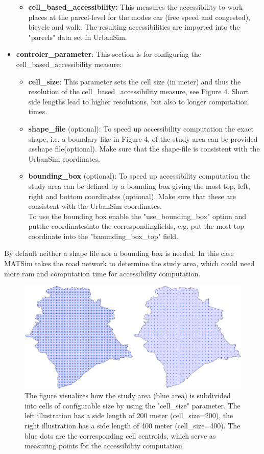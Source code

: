 \begin{itemize}
\begin{itemize}
	\item \textbf{cell\_based\_accessibility: }This measures the  accessibility to work places at the parcel-level for the modes car (free  speed and congested), bicycle and walk. The resulting accessibilities  are imported into the "parcels" data set in UrbanSim.
\end{itemize}
	\item \textbf{controler\_parameter}: This section is for configuring the cell\_based\_accessibility measure:   
\begin{itemize}
	\item \textbf{cell\_size}: This parameter sets the cell size  (in meter) and thus the resolution of the cell\_based\_accessibility  measure, see Figure 4. Short side lengths lead to higher resolutions,  but also to longer computation times.
	\item \textbf{shape\_file} (optional): To speed up accessibility  computation the exact shape, i.e. a boundary like in Figure 4, of the  study area can be provided asshape file(optional). Make sure that the shape-file is consistent with the UrbanSim coordinates.
	\item \textbf{bounding\_box }(optional): To speed up  accessibility computation the study area can be defined by a bounding  box giving the most top, left, right and bottom coordinates (optional).  Make sure that these are consistent with the UrbanSim coordinates.
\\     To use the bounding box enable the "use\_bounding\_box" option and putthe coordinatesinto the correspondingfields, e.g. put the most top coordinate into the "baounding\_box\_top" field.
\end{itemize}
\end{itemize}

By  default neither a shape file nor a bounding box is needed. In this case  MATSim takes the road network to determine the study area, which could  need more ram and computation time for accessibility computation.

\begin{figure}[htp]
\includegraphics[width=\textwidth]{figures/matsim4urbansim/resolution.png}
\caption{The figure visualizes how the study area (blue area) is  subdivided into cells of configurable size by using the "cell\_size"  parameter. The left illustration has a side length of 200 meter  (cell\_size=200), the right illustration has a side length of 400 meter  (cell\_size=400). The blue dots are the corresponding cell centroids,  which serve as measuring points for the accessibility computation.}
\end{figure}

